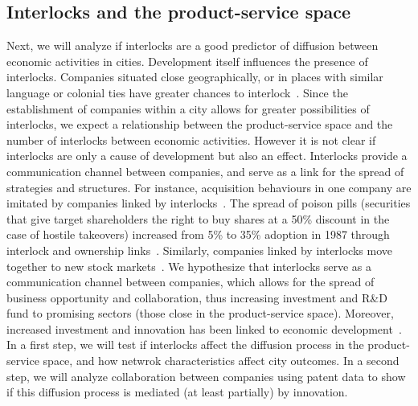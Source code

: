 \subsection{Interlocks and the product-service space}
\label{sec:interlockspss}
Next, we will analyze if interlocks are a good predictor of diffusion between economic activities in cities. 
Development itself influences the presence of interlocks.
Companies situated close geographically, or in places with similar language or colonial ties 
have greater chances to interlock~\citep{nobel2004economische}.
Since the establishment of companies within a city allows for greater possibilities of interlocks,
we expect a relationship between the product-service space and the number of interlocks between economic activities.
However it is not clear if interlocks are only a cause of development but also an effect.
Interlocks provide a communication channel between companies, 
and serve as a link for the spread of strategies and structures.
For instance, acquisition behaviours in one company are imitated by companies linked by interlocks~\citep{Haunschild1993}.
The spread of poison pills (securities that give target shareholders the right to buy shares at a 50\% discount in the case of hostile takeovers) increased from 5\% to 35\% adoption in 1987 through interlock and ownership links~\cite{Davis1997,Davis1991}. 
Similarly, companies linked by interlocks move together to new stock markets~\citep{Rao1999}.
We hypothesize that interlocks serve as a communication channel between companies,
which allows for the spread of business opportunity and collaboration,
thus increasing investment and R\&D fund to promising sectors (those close in the product-service space).
Moreover, increased investment and innovation has been linked to economic development~\citep{Romer1991,grossman1991,hidalgo2007}.
In a first step, we will test if interlocks affect the diffusion process in the product-service space,
and how netwrok characteristics affect city outcomes.
In a second step, we will analyze collaboration between companies using patent data to show if this diffusion process is mediated (at least partially) by innovation.

